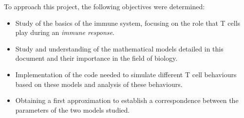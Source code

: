 To approach this project, the following objectives were determined:

\begin{itemize}
	
	\item Study of the basics of the immune system, focusing on the role that T cells play during an \textit{immune response}.
	
	\item Study and understanding of the mathematical models detailed in this document and their importance in the field of biology.
	
	\item Implementation of the code needed to simulate different T cell behaviours based on these models and analysis of these behaviours. 
	
	\item Obtaining a first approximation to establish a correspondence between the parameters of the two models studied. 
\end{itemize}







